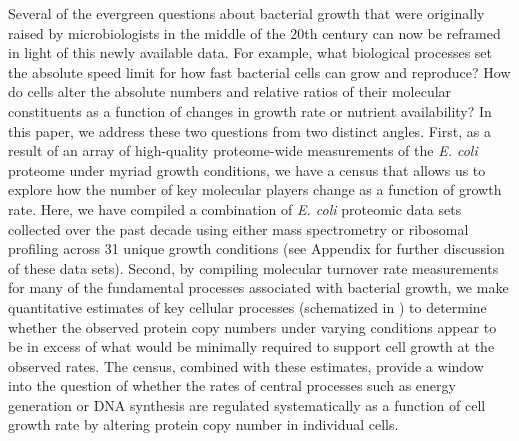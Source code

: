 Several of the evergreen questions about bacterial growth that were originally
raised by microbiologists in the middle of the 20th century can now be reframed
in light of this newly available data. For example, what biological
processes set the absolute speed limit for how fast bacterial cells can grow and
reproduce? How do cells alter the absolute numbers and relative ratios of their
molecular constituents as a function of changes in growth rate or nutrient
availability? In this paper, we address these two questions from two distinct
angles. First, as a result of an array of high-quality proteome-wide
measurements of the \textit{E. coli} proteome under myriad growth
conditions, we have a census that allows us to explore how the number of key
molecular players change as a function of growth rate. Here, we have compiled
a combination of \textit{E. coli} proteomic data sets collected over the past decade using
either mass spectrometry \citep{schmidt2016, peebo2015, valgepea2013} or
ribosomal profiling \citep{li2014} across 31 unique growth conditions (see Appendix  for further discussion
of these data sets). Second, by
compiling molecular turnover rate measurements for many of the fundamental
processes associated with bacterial growth, we make quantitative estimates
of key cellular processes (schematized in ) to determine whether the observed protein copy numbers under varying conditions
appear to be in excess of what would be minimally required to support cell
growth at the observed rates.
The census, combined with these estimates, provide a
window into the question of whether the rates of central processes such as
energy generation or DNA synthesis are regulated systematically as a function of
cell growth rate by altering protein copy number in individual cells.


